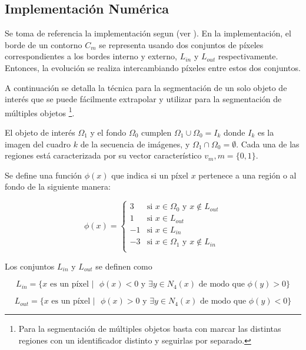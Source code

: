 \documentclass[a4paper,10pt]{article}
\begin{document}
\subsection{Implementación Numérica}

Se toma de referencia la implementación segun \citeauthor{fast-level-set} (ver \cite{fast-level-set}).
En la implementación, el borde de un contorno $C_m$ se representa usando dos conjuntos de píxeles
correspondientes a los bordes interno y externo, $L_{in}$ y $L_{out}$
respectivamente. Entonces, la evolución se realiza intercambiando píxeles entre
estos dos conjuntos.

A continuación se detalla la técnica para la segmentación de un solo objeto de
interés que se puede fácilmente extrapolar y utilizar para la
segmentación de múltiples objetos
\footnote{Para la segmentación de múltiples objetos basta con marcar las distintas regiones con un identificador
distinto y seguirlas por separado.}.

El objeto de interés $\Omega_{1}$ y el fondo $\Omega_{0}$ cumplen
$\Omega_{1}\cup\Omega_{0} = I_{k}$ donde $I_{k}$ es la imagen del cuadro $k$ de
la secuencia de imágenes, y $\Omega_{1}\cap\Omega_{0} = \emptyset$. Cada una de
las regiones está caracterizada por su vector característico $v_{m}, m =
\{0,1\}$.

Se define una función $\phi(x)$ que indica si un píxel $x$ pertenece a una región o al fondo de la siguiente manera:

\begin{equation}
\phi(x) =
\left\{
    \begin{array}{ll}
        3  & \mbox{si } x \in \Omega_{0} \mbox{  y  } x \notin L_{out} \\
        1  & \mbox{si } x \in L_{out}\\
        -1  & \mbox{si } x \in L_{in}\\
        -3 & \mbox{si } x \in \Omega_{1} \mbox{  y  } x \notin L_{in} \\
    \end{array}
\right.
\end{equation}

Los conjuntos $L_{in}$ y $L_{out}$ se definen como

\begin{equation}
    L_{in} = \{ x \mbox{ es un píxel } \vert \mbox{    }  \phi(x) < 0 \mbox{ y } \exists y \in N_{4}(x) \mbox{ de modo que } \phi(y) > 0 \}
\end{equation}

\begin{equation}
    L_{out} = \{ x \mbox{ es un píxel } \vert \mbox{    } \phi(x) > 0 \mbox{ y } \exists y \in N_{4}(x) \mbox{ de modo que } \phi(y) < 0 \}
\end{equation}
\end{document}
